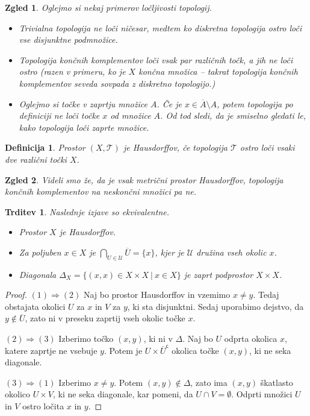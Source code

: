 \documentclass[10pt, a4paper]{article}
\newtheorem{trditev}[izr]{Trditev}
\newtheorem{defi}{Definicija}[section]
\newenvironment{noticeB}{%
  \tcolorbox[%
  notitle,
  empty,
  enhanced,  %
  breakable,
  coltext=black,
  colback=white, 
  fontupper=\rmfamily,
  parbox=false,
  noparskip,
  sharp corners,
  boxrule=-1pt,  %
  frame hidden,
  left=7pt,  %
  right=7pt,
  top=5pt,
  bottom=5pt,
  before skip=2.5ex plus 2pt,
  after skip=2.5ex plus 2pt,
  borderline west = {1.5pt}{-0.1pt}{blue!30!black}, %
  overlay unbroken and last={%
    \draw[color=black, line width=1.25pt]
    ($(frame.south west)+(1.pt, -0.1pt)$) -- ++(2em, 0);
  }
  ]}
{\endtcolorbox}
\newenvironment{definicija}{\begin{noticeB}\begin{defi}}{%
    \end{defi}\end{noticeB}}
\newtheorem{zgled}{Zgled}[section]
\newenvironment{noticeC}{%
  \tcolorbox[%
  notitle,
  empty,
  enhanced,  %
  breakable,
  coltext=black, 
  fontupper=\rmfamily,
  parbox=false,
  noparskip,
  sharp corners,
  boxrule=-1pt,  %
  frame hidden,
  left=7pt,  %
  right=7pt,
  top=5pt,
  bottom=5pt,
  before skip=2.5ex plus 2pt,
  after skip=2.5ex plus 2pt,
  overlay unbroken and last={%
  },
  ]}
{\endtcolorbox}
\newenvironment{dokaz}%
  {\begin{noticeC}\begin{proof}}%
  {\end{proof}\end{noticeC}}
\newcommand{\stcomp}[1]{{#1}^{\mathsf{c}}}
\newcommand{\topo}[1]{\mathcal{#1}}
\begin{document}
\begin{zgled}
  Oglejmo si nekaj primerov ločljivosti topologij.
  \begin{itemize}
    \item Trivialna topologija ne loči ničesar, medtem ko diskretna topologija ostro loči vse disjunktne podmnožice.
    \item Topologija končnih komplementov loči vsak par različnih točk, a jih ne loči ostro 
    (razen v primeru, ko je $X$ končna množica -- takrat topologija končnih komplementov seveda sovpada z diskretno topologijo.)
    \item Oglejmo si točke v zaprtju množice $A$. Če je $x \in \overline{A} \setminus A$,
    potem topologija po definiciji ne loči točke $x$ od množice $A$.
    Od tod sledi, da je smiselno gledati le, kako topologija loči zaprte množice.
  \end{itemize}
\end{zgled}

\begin{definicija}
  Prostor $(X, \topo{T})$ je Hausdorffov, če topologija $\topo{T}$ 
  ostro loči vsaki dve različni točki $X$.
\end{definicija}

\begin{zgled}
  Videli smo že, da je vsak metrični prostor Hausdorffov, topologija končnih 
  komplementov na neskončni množici pa ne.
\end{zgled}

\begin{trditev}
  Naslednje izjave so ekvivalentne.
  \begin{itemize}
    \item Prostor $X$ je Hausdorffov.
    \item Za poljuben $x \in X$ je $\displaystyle \bigcap_{U \in \mathcal{U}} \overline{U} = \{x\}$, kjer je $\mathcal{U}$ družina vseh okolic $x$.
    \item Diagonala $\Delta_X = \{(x, x) \in X \times X\ |\ x \in X\}$ je zaprt podprostor $X \times X$.
  \end{itemize}
\end{trditev}

\begin{dokaz}
  $(1) \Rightarrow (2)$ Naj bo prostor Hausdorffov in vzemimo $x \neq y$.
  Tedaj obstajata okolici $U$ za $x$ in $V$ za $y$, ki sta disjunktni.
  Sedaj uporabimo dejstvo, da $y \notin \overline{U}$, zato ni v preseku zaprtij vseh okolic točke $x$.

  $(2) \Rightarrow (3)$ Izberimo točko $(x, y)$, ki ni v $\Delta$.
  Naj bo $U$ odprta okolica $x$, katere zaprtje ne vsebuje $y$.
  Potem je $U \times \stcomp{\overline{U}}$ okolica točke $(x, y)$, ki ne seka diagonale.

  $(3) \Rightarrow (1)$ Izberimo $x \neq y$. Potem $(x, y) \notin \Delta$, zato ima 
  $(x, y)$ škatlasto okolico $U \times V$, ki ne seka diagonale, kar pomeni, 
  da $U \cap V = \emptyset$. Odprti množici $U$ in $V$ ostro ločita $x$ in $y$.
\end{dokaz}
\end{document}
